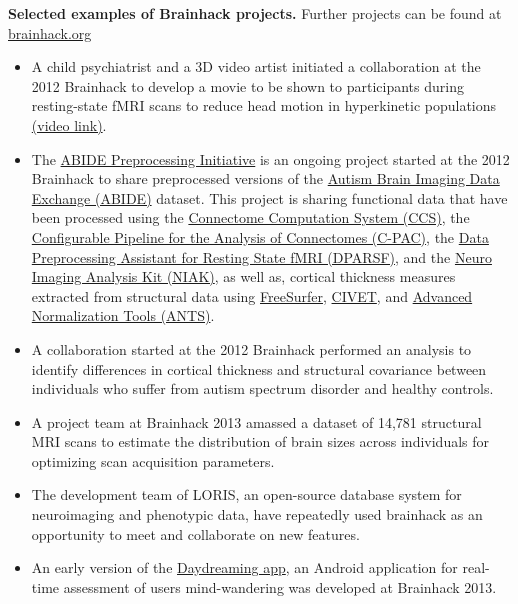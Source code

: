 \documentclass[11pt]{bmc_article_s50}
\begin{document}
\begin{table}[!ht]
\caption{{\bf Selected examples of Brainhack projects.} Further projects can be found at \href{http://www.brainhack.org}{brainhack.org}}\label{tab3}
\hline
    \begin{itemize}
    \item 
        A child psychiatrist and a 3D video artist initiated a collaboration at the 2012 Brainhack to develop a movie to be shown to participants during resting-state fMRI scans to reduce head motion in hyperkinetic populations \href{http://vimeo.com/67962604}{(video link)}\cite{vanderwal2015}.
    \item 
        The \href{http://preprocessed-connectomes-project.github.io/abide}{ABIDE Preprocessing Initiative} is an ongoing project started at the 2012 Brainhack to share preprocessed versions of the \href{http://fcon_1000.projects.nitrc.org/indi/abide}{Autism Brain Imaging Data Exchange (ABIDE)} dataset. This project is sharing functional data that have been processed using the \href{http://lfcd.psych.ac.cn/ccs.html}{Connectome Computation System (CCS)}, the \href{http://fcp-indi.github.io}{Configurable Pipeline for the Analysis of Connectomes (C-PAC)}, the \href{http://rfmri.org/DPARSF}{Data Preprocessing Assistant for Resting State fMRI (DPARSF)}, and the \href{https://www.nitrc.org/projects/niak/}{Neuro Imaging Analysis Kit (NIAK)}, as well as, cortical thickness measures extracted from structural data using \href{http://freesurfer.net/}{FreeSurfer}, \href{http://www.bic.mni.mcgill.ca/ServicesSoftware/CIVET}{CIVET}, and \href{http://picsl.upenn.edu/software/ants/}{Advanced Normalization Tools (ANTS)}.
    \item
        A collaboration started at the 2012 Brainhack performed an analysis to identify differences in cortical thickness and structural covariance between individuals who suffer from autism spectrum disorder and healthy controls\cite{Valk2015}.
    \item
        A project team at Brainhack 2013 amassed a dataset of 14,781 structural MRI scans to estimate the distribution of brain sizes across individuals for optimizing scan acquisition parameters\cite{Mennes2014}.
    \item 
        The development team of LORIS, an open-source database system for neuroimaging and phenotypic data, have repeatedly used brainhack as an opportunity to meet and collaborate on new features\cite{Das2012}.
    \item
        An early version of the \href{http://daydreaming-the-app.net}{Daydreaming app}, an Android application for real-time assessment of users mind-wandering was developed at Brainhack 2013.
    
    \end{itemize}
\hline
\end{table}
\end{document}
